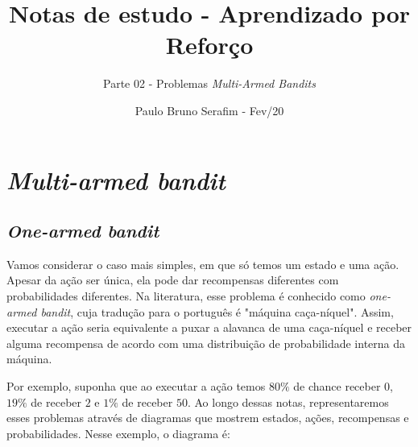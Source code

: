 \documentclass{article}
\title{Notas de estudo - Aprendizado por Reforço}
\author{Parte 02 - Problemas \emph{Multi-Armed Bandits}}
\date{Paulo Bruno Serafim - Fev/20}
\begin{document}
\maketitle

    \section{\textit{Multi-armed bandit}}
    
        \subsection{\emph{One-armed bandit}}
        
            Vamos considerar o caso mais simples, em que só temos um estado e uma ação. Apesar da ação ser única, ela pode dar recompensas diferentes com probabilidades diferentes. Na literatura, esse problema é conhecido como \emph{one-armed bandit}, cuja tradução para o português é "máquina caça-níquel". Assim, executar a ação seria equivalente a puxar a alavanca de uma caça-níquel e receber alguma recompensa de acordo com uma distribuição de probabilidade interna da máquina.

            Por exemplo, suponha que ao executar a ação temos $80\%$ de chance receber $0$, $19\%$ de receber $2$ e $1\%$ de receber $50$. Ao longo dessas notas, representaremos esses problemas através de diagramas que mostrem estados, ações, recompensas e probabilidades. Nesse exemplo, o diagrama é:
            
            \begin{center}
            \end{center}
\end{document}
